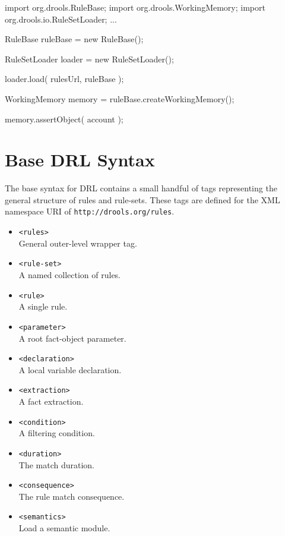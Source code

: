 \begin{codelisting}
import org.drools.RuleBase;
import org.drools.WorkingMemory;
import org.drools.io.RuleSetLoader;
...

    RuleBase ruleBase = new RuleBase();

    RuleSetLoader loader = new RuleSetLoader();

    loader.load( rulesUrl, ruleBase );

    WorkingMemory memory = ruleBase.createWorkingMemory();

    memory.assertObject( account );
\end{codelisting}

\section{Base DRL Syntax}

The base syntax for DRL contains a small handful of tags 
representing the general structure of rules and rule-sets.
These tags are defined for the XML namespace URI of
\verb|http://drools.org/rules|.

\begin{itemize}
	\item \verb|<rules>|\\
		General outer-level wrapper tag.
	\item \verb|<rule-set>|\\
		A named collection of rules.
	\item \verb|<rule>|\\
		A single rule.
	\item \verb|<parameter>|\\
		A root fact-object parameter.
	\item \verb|<declaration>|\\
		A local variable declaration.
	\item \verb|<extraction>|\\
		A fact extraction.
	\item \verb|<condition>|\\
		A filtering condition.
	\item \verb|<duration>|\\
		The match duration.
	\item \verb|<consequence>|\\
		The rule match consequence.
	\item \verb|<semantics>|\\
		Load a semantic module.
\end{itemize}

